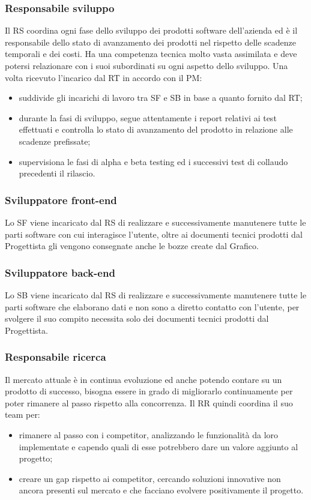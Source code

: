 \subsubsection{Responsabile sviluppo}
Il RS coordina ogni fase dello sviluppo dei prodotti software dell\textquoteright{}azienda ed \`{e} il responsabile
dello stato di avanzamento dei prodotti nel rispetto delle scadenze temporali e
dei costi. Ha una competenza tecnica molto vasta assimilata e deve potersi
relazionare con i suoi subordinati su ogni aspetto dello sviluppo. Una volta ricevuto
l\textquoteright{}incarico dal RT in accordo con il PM:
\begin{itemize}
\item suddivide gli incarichi di lavoro tra SF e SB in base a quanto fornito dal RT;
\item durante la fasi di sviluppo, segue attentamente i report relativi ai test effettuati e
controlla lo stato di avanzamento del prodotto in relazione alle scadenze prefissate;
\item supervisiona le fasi di alpha e beta testing ed i successivi test di collaudo precedenti
il rilascio.
\end{itemize}

\subsubsection{Sviluppatore front-end}
Lo SF viene incaricato dal RS di realizzare e successivamente manutenere tutte le parti
software con cui interagisce l\textquoteright{}utente, oltre ai documenti tecnici prodotti dal Progettista
gli vengono consegnate anche le bozze create dal Grafico.

\subsubsection{Sviluppatore back-end}
Lo SB viene incaricato dal RS di realizzare e successivamente manutenere tutte le parti
software che elaborano dati e non sono a diretto contatto con l\textquoteright{}utente, per svolgere il
suo compito necessita solo dei documenti tecnici prodotti dal Progettista.

\subsubsection{Responsabile ricerca}
Il mercato attuale \`{e} in continua evoluzione ed anche potendo contare su un prodotto
di successo, bisogna essere in grado di migliorarlo continuamente per poter rimanere al
passo rispetto alla concorrenza. Il RR quindi coordina il suo team per:
\begin{itemize}
\item rimanere al passo con i competitor, analizzando le funzionalit\`{a} da loro
implementate e capendo quali di esse potrebbero dare un valore aggiunto al
progetto;
\item creare un gap rispetto ai competitor, cercando soluzioni innovative non ancora
presenti sul mercato e che facciano evolvere positivamente il progetto.
\end{itemize}


